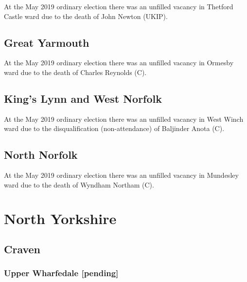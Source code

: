 \documentclass[a4paper,openany]{book}
\begin{document}
\begin{resultsiii}
At the May 2019 ordinary election there was an unfilled vacancy in Thetford Castle ward due to the death of John Newton (UKIP).

\subsection*{Great Yarmouth}

At the May 2019 ordinary election there was an unfilled vacancy in Ormesby ward due to the death of Charles Reynolds (C).

\subsection*{King's Lynn and West Norfolk}

At the May 2019 ordinary election there was an unfilled vacancy in West Winch ward due to the disqualification (non-attendance) of Baljinder Anota (C).

\subsection*{North Norfolk}

At the May 2019 ordinary election there was an unfilled vacancy in Mundesley ward due to the death of Wyndham Northam (C).

\section{North Yorkshire}

\subsection*{Craven}

\subsubsection*{Upper Wharfedale \hspace*{\fill}\nolinebreak[1]%
	\enspace\hspace*{\fill}
	[pending]}



\end{resultsiii}
\end{document}

